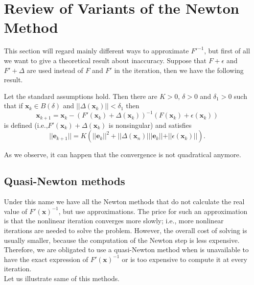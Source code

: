 \section{Review of Variants of the Newton Method}
This section will regard mainly different ways to approximate ${F'}^{-1}$, but first of all we want to give a theoretical result about inaccuracy. Suppose that $F + \epsilon$ and $F' + \Delta$ are used instead of $F$ and $F'$ in the iteration, then we have the following result.
\begin{theorem}
	\label{accuracy}
	Let the standard assumptions hold. Then there are $K>0$, $\delta>0$ and $\delta_1>0$ such that if $\textbf{x}_{k} \in \mathit{B}(\delta)$ and $||\Delta(\textbf{x}_{k}) ||<\delta_1$ then 
 \begin{equation*}
 \textbf{x}_{k+1}=\textbf{x}_{k} - (F'(\textbf{x}_k)+\Delta(\textbf{x}_k))^{-1}(F(\textbf{x}_k)+\epsilon(\textbf{x}_k))
 \end{equation*}
	is defined (i.e.,$F'(\textbf{x}_k)+\Delta(\textbf{x}_k)$ is nonsingular) and satisfies 
\begin{equation*}
||{\textbf{e}}_{k+1}|| =K(||{\textbf{e}}_{k}||^2 + ||\Delta(\textbf{x}_n)|||\textbf{e}_k ||+||\epsilon(\textbf{x}_k) || ).
\end{equation*}
	
\end{theorem} 
As we observe, it can happen that the convergence is not quadratical anymore. 
\subsection{Quasi-Newton methods} 
Under this name we have all the Newton methods that do not calculate the real value of ${F'(\textbf{x})}^{-1}$, but use approximations. The price for such an approximation is that the nonlinear iteration converges more slowly; i.e., more nonlinear iterations are needed to solve the problem. However, the overall cost of solving is usually smaller, because the computation of the Newton step is less expensive.
Therefore, we are obligated to use a quasi-Newton method when is unavailable to have the exact expression of ${F'(\textbf{x})}^{-1}$ or is too expensive to compute it at every iteration. \\
Let us illustrate same of this methods. \\

